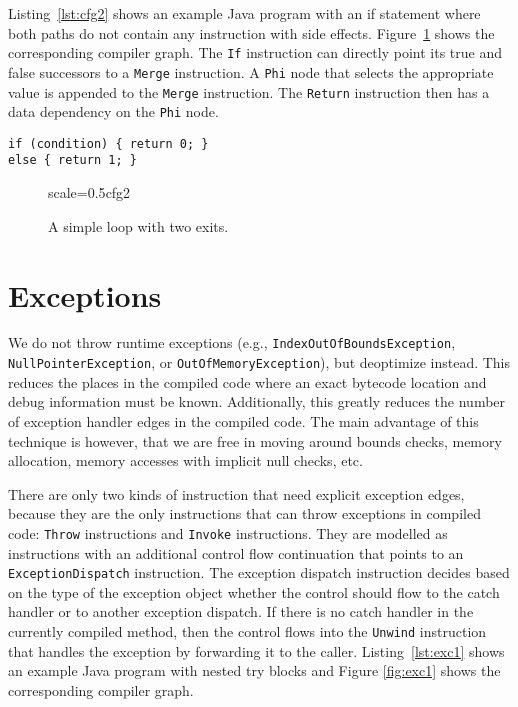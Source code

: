 \documentclass[twocolumn]{svjour3}
\begin{document}
Listing~\ref{lst:cfg2} shows an example Java program with an if statement where both paths do not contain any instruction with side effects.
Figure~\ref{fig:loopexits} shows the corresponding compiler graph.
The \texttt{If} instruction can directly point its true and false successors to a \texttt{Merge} instruction.
A \texttt{Phi} node that selects the appropriate value is appended to the \texttt{Merge} instruction.
The \texttt{Return} instruction then has a data dependency on the \texttt{Phi} node.

\begin{lstlisting}[label=lst:cfg2, caption=Control flow in the graph., captionpos=b]
if (condition) { return 0; }
else { return 1; }
\end{lstlisting}

\begin{figure}[ht]
  \centering
\begin{digraphenv}{scale=0.5}{cfg2}
\end{digraphenv}
  \caption{A simple loop with two exits.}
  \label{fig:loopexits}
\end{figure}

\section{Exceptions}
\label{sec:Exceptions}

We do not throw runtime exceptions (e.g., \texttt{IndexOutOf\-BoundsException}, \texttt{Null\-Pointer\-Exception}, or \texttt{Out\-Of\-Memory\-Exception}), but deoptimize instead.
This reduces the places in the compiled code where an exact bytecode location and debug information must be known.
Additionally, this greatly reduces the number of exception handler edges in the compiled code.
The main advantage of this technique is however, that we are free in moving around bounds checks, memory allocation, memory accesses with implicit null checks, etc.

There are only two kinds of instruction that need explicit exception edges, because they are the only instructions that can throw exceptions in compiled code: \texttt{Throw} instructions and \texttt{Invoke} instructions.
They are modelled as instructions with an additional control flow continuation that points to an \texttt{ExceptionDispatch} instruction.
The exception dispatch instruction decides based on the type of the exception object whether the control should flow to the catch handler or to another exception dispatch.
If there is no catch handler in the currently compiled method, then the control flows into the \texttt{Unwind} instruction that handles the exception by forwarding it to the caller.
Listing~\ref{lst:exc1} shows an example Java program with nested try blocks and Figure \ref{fig:exc1} shows the corresponding compiler graph.
\end{document}
